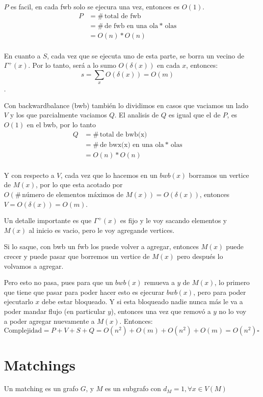 \documentclass[12pt,a4paper]{article}
\begin{document}
$P$ es facil, en cada fwb solo se ejecura una vez, entonces es $O(1)$.
\begin{align*}
    P &= \#\,\text{total de fwb}\\
    &= \#\,\text{de fwb en una ola} * \,\text{olas}\\
    &= O(n) * O(n)\\
\end{align*}

En cuanto a $S$, cada vez que se ejecuta uno de esta parte, se borra un vecino de 
$\Gamma^{+}(x)$. Por lo tanto, será a lo sumo $O(\delta(x))$ en cada $x$, entonces:
$$s = \sum_{x} O(\delta(x)) = O(m)$$.
\medskip

Con backwardbalance (bwb) también lo dividimos en casos que vaciamos un lado $V$ y 
los que parcialmente vaciamos $Q$. El analisis de $Q$ es igual que el de $P$, es 
$O(1)$ en el bwb, por lo tanto
\begin{align*}
    Q &= \#\,\text{total de bwb(x)}\\
    &= \#\,\text{de bwx(x) en una ola} * \,\text{olas}\\
    &= O(n) * O(n)\\
\end{align*}

Y con respecto a $V$, cada vez que lo hacemos en un $bwb(x)$ borramos un vertice 
de $M(x)$, por lo que esta acotado por $O(\#\,\text{número de elementos máximos de $M(x)$}) = O(\delta(x))$, 
entonces $V = O(\delta(x)) = O(m)$.
\medskip

Un detalle importante es que $\Gamma^{+}(x)$ es fijo y le voy sacando elementos y 
$M(x)$ al inicio es vacio, pero le voy agregande vertices.
\medskip

Si lo saque, con bwb un fwb los puede volver a agregar, entonces $M(x)$ puede 
crecer y puede pasar que borremos un vertice de $M(x)$ pero después lo volvamos 
a agregar.
\medskip

Pero esto no pasa, pues para que un $bwb(x)$ remueva a $y$ de $M(x)$, lo primero 
que tiene que pasar para poder hacer esto es ejecurar $bwb(x)$, pero para 
poder ejecutarlo $x$ debe estar bloqueado. Y si esta bloqueado nadie nunca más 
le va a poder mandar flujo (en particular $y$), entonces una vez que removó a $y$ 
no lo voy a poder agregar nuevamente a $M(x)$. Entonces:
$$\text{Complejidad} = P + V + S + Q = O(n^{2}) + O(m) + O(n^{2}) + O(m) = O(n^{2}) \square$$


\section{Matchings}
\begin{definition} Un matching es un grafo $G$, y $M$ es un subgrafo con $d_{M} = 1, \forall x \in V(M)$
\end{definition}
\end{document}

